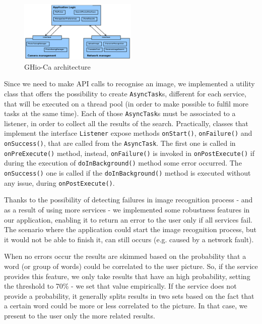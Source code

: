 \begin{figure}[h]
    \centering
    \includegraphics[width=0.50\textwidth]{../img/ghioca_macro_component}
    \caption{GHio-Ca architecture}
    \label{fig:architecture}
\end{figure}

Since we need to make API calls to recognise an image, we implemented a
utility class that offers the possibility to create \texttt{AsyncTask}s,
different for each service, that will be executed on a thread pool (in order to
make possible to fulfil more tasks at the same time). Each of those
\texttt{AsyncTask}s must be associated to a listener, in order to collect all
the results of the search. Practically, classes that implement the interface
\texttt{Listener} expose methods \texttt{onStart()}, \texttt{onFailure()} and
\texttt{onSuccess()}, that are called from the \texttt{AsyncTask}. The first one
is called in \texttt{onPreExecute()} method, instead, \texttt{onFailure()} is 
invoked in \texttt{onPostExecute()} if during the execution of \texttt{doInBackground()} 
method some error occurred. The \texttt{onSuccess()} one is called if the 
\texttt{doInBackground()} method is executed without any issue, during 
\texttt{onPostExecute()}.

Thanks to the possibility of detecting failures in image recognition process - 
and as a result of using more services - we implemented some robustness features 
in our application, enabling it to return an error to the user only if all 
services fail. The scenario where the application could start the image 
recognition process, but it would not be able to finish it, can still occurs 
(e.g. caused by a network fault).

When no errors occur the results are skimmed based on the probability that a
word (or group of words) could be correlated to the user picture. So, if the
service provides this feature, we only take results that have an high
probability, setting the threshold to 70\% - we set that value empirically. If 
the service does not provide a probability, it generally splits results in two 
sets based on the fact that a certain word could be more or less correlated to 
the picture. In that case, we present to the user only the more related results.

